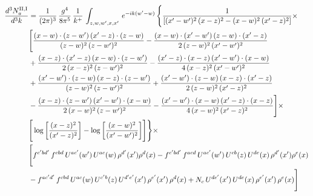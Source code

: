 \documentclass[9pt]{article}
\numberwithin{equation}{section}
\begin{document}
\begin{align}
    \frac{d^{3}N^{\rm II,I}_{a}}{d^{3}k}  & =  \frac{1}{(2\pi)^{3}}\, \frac{g^{4}}{8\pi^{5}}\,\frac{1}{k^{+}}\,\int_{z,w,w^{\prime},x,x'}\, e^{-ik(w^{\prime}-w)}\, \Bigg\{ \frac{1}{\left[(x'-w')^{2}\, (x-z)^{2}-(x-w)^{2}\, (x'-z)^{2}\right]}\times\,\notag \\ & \Bigg[\frac{(x-w)\cdot (z-w')\, (x'-z)\cdot (z-w)}{(z-w)^{2}\,(z-w')^{2}}-\frac{(x-w)\cdot (x'-w')\, (z-w)\cdot (x'-z)}{2\, (z-w)^{2}\, (x'-w')^{2}}\notag \\ & + \frac{(x-z)\cdot (x'-z)\, (x-w)\cdot (z-w')}{2\, (x-z)^{2}\, (z-w')^{2}}-\frac{(x'-z)\cdot (x-z)\, (x'-w')\cdot (x-w)}{4\, (x-z)^{2}\, (x'-w')^{2}}\notag \\ & + \frac{(x'-w')\cdot (z-w)\, (x-z)\cdot (z-w')}{(z-w)^{2}\,(z-w')^{2}}+\frac{(x'-w')\cdot (z-w)\, (x-z)\cdot (x'-z)}{2\, (z-w)^{2}\, (x'-z)^{2}}\notag \\ & - \frac{(x-z)\cdot (z-w')\, (x'-w')\cdot (x-w)}{2\, (x-w)^{2}\, (z-w')^{2}} -\frac{(x'-w')\cdot (x-w)\, (x'-z)\cdot (x-z)}{4\, (x-w)^{2}\, (x'-z)^{2}}\Bigg]\times\notag \\ &  \Bigg[\log{\left[\frac{(x-z)^{2}}{ (x'-z)^{2}}\right]}-\log{\left[\frac{(x-w)^{2}}{(x'-w')^{2}}\right]}\Bigg]\Bigg\} \times\, \notag \\ & \Bigg[f^{c'bd'}\,f^{cbd}\, U^{ac'}(w')\,U^{ac}(w)\,\rho^{d'}(x')\rho^{d}(x)- f^{c'bd'}\,f^{acd}\,U^{ac'}(w')\,U^{cb}(z)\,U^{de}(x)\,\rho^{d'}(x')\rho^{e}(x) \notag \\ & -f^{ac'd'}\,f^{cbd}\,U^{ac}(w)\,U^{c'b}(z)\,U^{d'e'}(x')\,\rho^{e'}(x')\,\rho^{d}(x) +N_{c}\,U^{de'}(x')\,U^{de}(x)\,\rho^{e'}(x')\,\rho^{e}(x)\Bigg]
\end{align}
\end{document}

